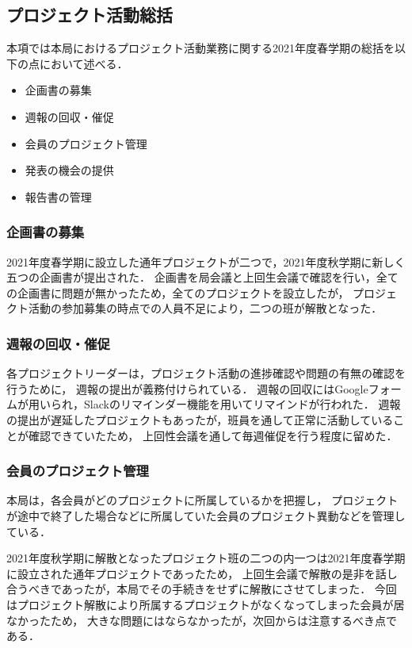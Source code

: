 \subsection*{プロジェクト活動総括}



本項では本局におけるプロジェクト活動業務に関する2021年度春学期の総括を以下の点において述べる．

\begin{itemize}
  \item 企画書の募集
  \item 週報の回収・催促
  \item 会員のプロジェクト管理
  \item 発表の機会の提供
  \item 報告書の管理
\end{itemize}

\subsubsection*{企画書の募集}

2021年度春学期に設立した通年プロジェクトが二つで，2021年度秋学期に新しく五つの企画書が提出された．
企画書を局会議と上回生会議で確認を行い，全ての企画書に問題が無かったため，全てのプロジェクトを設立したが，
プロジェクト活動の参加募集の時点での人員不足により，二つの班が解散となった．

\subsubsection*{週報の回収・催促}

各プロジェクトリーダーは，プロジェクト活動の進捗確認や問題の有無の確認を行うために，
週報の提出が義務付けられている．
週報の回収にはGoogleフォームが用いられ，Slackのリマインダー機能を用いてリマインドが行われた．
週報の提出が遅延したプロジェクトもあったが，班員を通して正常に活動していることが確認できていたため，
上回性会議を通して毎週催促を行う程度に留めた．

\subsubsection*{会員のプロジェクト管理}

本局は，各会員がどのプロジェクトに所属しているかを把握し，
プロジェクトが途中で終了した場合などに所属していた会員のプロジェクト異動などを管理している．

2021年度秋学期に解散となったプロジェクト班の二つの内一つは2021年度春学期に設立された通年プロジェクトであったため，
上回生会議で解散の是非を話し合うべきであったが，本局でその手続きをせずに解散にさせてしまった．
今回はプロジェクト解散により所属するプロジェクトがなくなってしまった会員が居なかったため，
大きな問題にはならなかったが，次回からは注意するべき点である．

